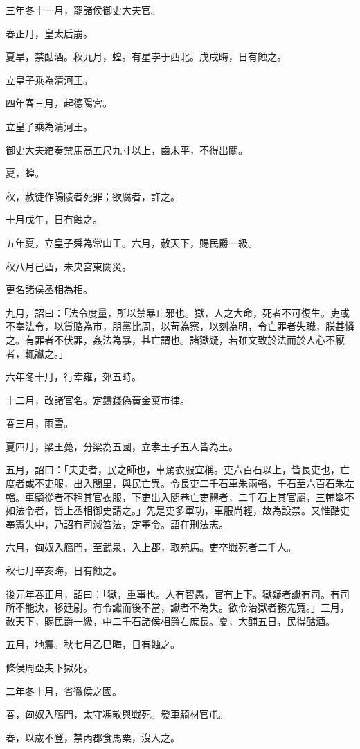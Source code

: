 \begin{pinyinscope}
三年冬十一月，罷諸侯御史大夫官。

春正月，皇太后崩。

夏旱，禁酤酒。秋九月，蝗。有星孛于西北。戊戌晦，日有蝕之。

立皇子乘為清河王。

四年春三月，起德陽宮。

立皇子乘為清河王。

御史大夫綰奏禁馬高五尺九寸以上，齒未平，不得出關。

夏，蝗。

秋，赦徒作陽陵者死罪；欲腐者，許之。

十月戊午，日有蝕之。

五年夏，立皇子舜為常山王。六月，赦天下，賜民爵一級。

秋八月己酉，未央宮東闕災。

更名諸侯丞相為相。

九月，詔曰：「法令度量，所以禁暴止邪也。獄，人之大命，死者不可復生。吏或不奉法令，以貨賂為市，朋黨比周，以苛為察，以刻為明，令亡罪者失職，朕甚憐之。有罪者不伏罪，姦法為暴，甚亡謂也。諸獄疑，若雖文致於法而於人心不厭者，輒讞之。」

六年冬十月，行幸雍，郊五畤。

十二月，改諸官名。定鑄錢偽黃金棄市律。

春三月，雨雪。

夏四月，梁王薨，分梁為五國，立孝王子五人皆為王。

五月，詔曰：「夫吏者，民之師也，車駕衣服宜稱。吏六百石以上，皆長吏也，亡度者或不吏服，出入閭里，與民亡異。令長吏二千石車朱兩轓，千石至六百石朱左轓。車騎從者不稱其官衣服，下吏出入閭巷亡吏體者，二千石上其官屬，三輔舉不如法令者，皆上丞相御史請之。」先是吏多軍功，車服尚輕，故為設禁。又惟酷吏奉憲失中，乃詔有司減笞法，定箠令。語在刑法志。

六月，匈奴入鴈門，至武泉，入上郡，取苑馬。吏卒戰死者二千人。

秋七月辛亥晦，日有蝕之。

後元年春正月，詔曰：「獄，重事也。人有智愚，官有上下。獄疑者讞有司。有司所不能決，移廷尉。有令讞而後不當，讞者不為失。欲令治獄者務先寬。」三月，赦天下，賜民爵一級，中二千石諸侯相爵右庶長。夏，大酺五日，民得酤酒。

五月，地震。秋七月乙巳晦，日有蝕之。

條侯周亞夫下獄死。

二年冬十月，省徹侯之國。

春，匈奴入鴈門，太守馮敬與戰死。發車騎材官屯。

春，以歲不登，禁內郡食馬粟，沒入之。


\end{pinyinscope}
